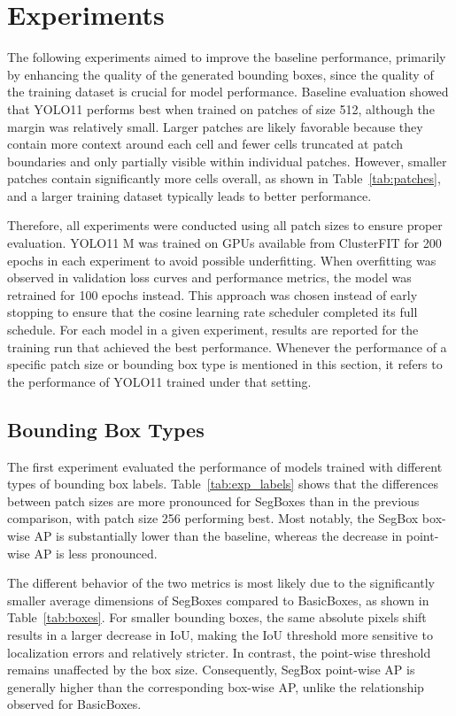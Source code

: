 \section{Experiments}
The following experiments aimed to improve the baseline performance, primarily by enhancing the quality of the generated bounding boxes, since the quality of the training dataset is crucial for model performance. Baseline evaluation showed that YOLO11 performs best when trained on patches of size 512, although the margin was relatively small. Larger patches are likely favorable because they contain more context around each cell and fewer cells truncated at patch boundaries and only partially visible within individual patches. However, smaller patches contain significantly more cells overall, as shown in Table~\ref{tab:patches}, and a larger training dataset typically leads to better performance.

Therefore, all experiments were conducted using all patch sizes to ensure proper evaluation. YOLO11 M was trained on GPUs available from ClusterFIT for 200 epochs in each experiment to avoid possible underfitting. When overfitting was observed in validation loss curves and performance metrics, the model was retrained for 100 epochs instead. This approach was chosen instead of early stopping to ensure that the cosine learning rate scheduler completed its full schedule. For each model in a given experiment, results are reported for the training run that achieved the best performance. Whenever the performance of a specific patch size or bounding box type is mentioned in this section, it refers to the performance of YOLO11 trained under that setting.

\subsection{Bounding Box Types}
The first experiment evaluated the performance of models trained with different types of bounding box labels. Table~\ref{tab:exp_labels} shows that the differences between patch sizes are more pronounced for SegBoxes than in the previous comparison, with patch size 256 performing best. Most notably, the SegBox box-wise AP is substantially lower than the baseline, whereas the decrease in point-wise AP is less pronounced.

The different behavior of the two metrics is most likely due to the significantly smaller average dimensions of SegBoxes compared to BasicBoxes, as shown in Table~\ref{tab:boxes}. For smaller bounding boxes, the same absolute pixels shift results in a larger decrease in IoU, making the IoU threshold more sensitive to localization errors and relatively stricter. In contrast, the point-wise threshold remains unaffected by the box size. Consequently, SegBox point-wise AP is generally higher than the corresponding box-wise AP, unlike the relationship observed for BasicBoxes.

